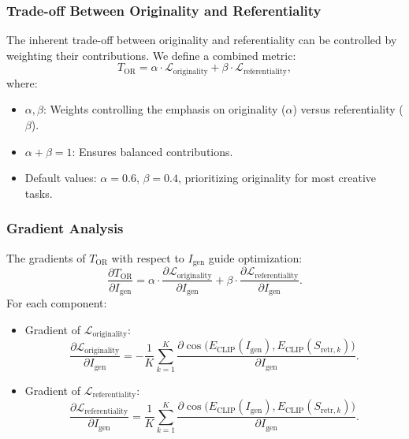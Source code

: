 \subsubsection{Trade-off Between Originality and Referentiality}
The inherent trade-off between originality and referentiality can be controlled by weighting their contributions. We define a combined metric:
\[
T_{\text{OR}} = \alpha \cdot \mathcal{L}_{\text{originality}} + \beta \cdot \mathcal{L}_{\text{referentiality}},
\]
where:
\begin{itemize}
    \item \(\alpha, \beta\): Weights controlling the emphasis on originality (\(\alpha\)) versus referentiality (\(\beta\)).
    \item \(\alpha + \beta = 1\): Ensures balanced contributions.
    \item Default values: \(\alpha = 0.6\), \(\beta = 0.4\), prioritizing originality for most creative tasks.
\end{itemize}


\subsubsection{Gradient Analysis}
The gradients of \(T_{\text{OR}}\) with respect to \(I_{\text{gen}}\) guide optimization:
\[
\frac{\partial T_{\text{OR}}}{\partial I_{\text{gen}}} = \alpha \cdot \frac{\partial \mathcal{L}_{\text{originality}}}{\partial I_{\text{gen}}} + \beta \cdot \frac{\partial \mathcal{L}_{\text{referentiality}}}{\partial I_{\text{gen}}}.
\]
For each component:
\begin{itemize}
    \item Gradient of \(\mathcal{L}_{\text{originality}}\):
    \[
    \frac{\partial \mathcal{L}_{\text{originality}}}{\partial I_{\text{gen}}} = - \frac{1}{K} \sum_{k=1}^K \frac{\partial \cos\bigl(E_{\text{CLIP}}(I_{\text{gen}}), E_{\text{CLIP}}(S_{\text{retr},k})\bigr)}{\partial I_{\text{gen}}}.
    \]
    \item Gradient of \(\mathcal{L}_{\text{referentiality}}\):
    \[
    \frac{\partial \mathcal{L}_{\text{referentiality}}}{\partial I_{\text{gen}}} = \frac{1}{K} \sum_{k=1}^K \frac{\partial \cos\bigl(E_{\text{CLIP}}(I_{\text{gen}}), E_{\text{CLIP}}(S_{\text{retr},k})\bigr)}{\partial I_{\text{gen}}}.
    \]
\end{itemize}


